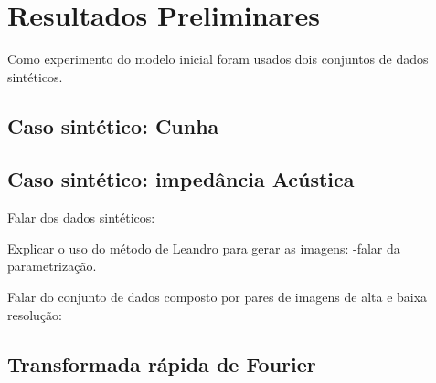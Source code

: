 \section{Resultados Preliminares}
Como experimento do modelo inicial foram usados dois conjuntos de dados sintéticos.

 
\subsection{Caso sintético: Cunha}

\subsection{Caso sintético: impedância Acústica}
Falar dos dados sintéticos:

Explicar o uso do método de Leandro para gerar as imagens:
-falar da parametrização.

Falar do conjunto de dados composto por pares de imagens de alta e baixa resolução:

\subsection{Transformada rápida de Fourier}

